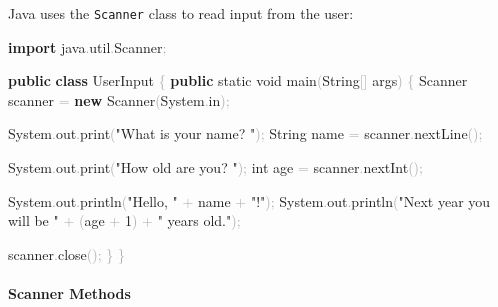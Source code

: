 \documentclass[
  justified,
  openright,
]{tufte-book}
\let\subsection\paragraph
\let\paragraph\paragraph
\newcommand{\KeywordTok}[1]{\textcolor{CodeKeyword}{\textbf{#1}}}  %
\newcommand{\StringTok}[1]{\textcolor{CodeString}{#1}}              %
\newcommand{\CodeNumTok}[1]{\textcolor{CodeNumber}{#1}}             %
\newcommand{\CodeFuncTok}[1]{\textcolor{CodeKeyword}{#1}}           %
\newcommand{\CodeTypeTok}[1]{\textcolor{CodeType}{#1}}              %
\newcommand{\CodeAccentTok}[1]{\textcolor{CodeAccent}{#1}}          %
\newcommand{\OperatorTok}[1]{\textcolor{DarkGray}{#1}}              %
\newenvironment{Shaded}{%
  \begin{mdframed}[style=TufteCode]%
}{%
  \end{mdframed}%
}
\let\subsection\paragraph
\let\paragraph\paragraph
\begin{document}
Java uses the \texttt{Scanner} class to read input from the user:

\begin{Shaded}
\begin{Highlighting}[]
\KeywordTok{import} \CodeAccentTok{java}\OperatorTok{.}\CodeAccentTok{util}\OperatorTok{.}\CodeAccentTok{Scanner}\OperatorTok{;}
 
\KeywordTok{public} \KeywordTok{class} UserInput \OperatorTok{\{}
    \KeywordTok{public} \CodeTypeTok{static} \CodeTypeTok{void} \CodeFuncTok{main}\OperatorTok{(}String\OperatorTok{[]} args\OperatorTok{)} \OperatorTok{\{}
        Scanner scanner \OperatorTok{=} \KeywordTok{new} Scanner\OperatorTok{(}System\OperatorTok{.}\CodeFuncTok{in}\OperatorTok{);}
 
        System\OperatorTok{.}\CodeFuncTok{out}\OperatorTok{.}\CodeFuncTok{print}\OperatorTok{(}\StringTok{"What is your name? "}\OperatorTok{);}
        String name \OperatorTok{=} scanner\OperatorTok{.}\CodeFuncTok{nextLine}\OperatorTok{();}
 
        System\OperatorTok{.}\CodeFuncTok{out}\OperatorTok{.}\CodeFuncTok{print}\OperatorTok{(}\StringTok{"How old are you? "}\OperatorTok{);}
        \CodeTypeTok{int} age \OperatorTok{=} scanner\OperatorTok{.}\CodeFuncTok{nextInt}\OperatorTok{();}
 
        System\OperatorTok{.}\CodeFuncTok{out}\OperatorTok{.}\CodeFuncTok{println}\OperatorTok{(}\StringTok{"Hello, "} \OperatorTok{+} name \OperatorTok{+} \StringTok{"!"}\OperatorTok{);}
        System\OperatorTok{.}\CodeFuncTok{out}\OperatorTok{.}\CodeFuncTok{println}\OperatorTok{(}\StringTok{"Next year you will be "} \OperatorTok{+} \OperatorTok{(}age \OperatorTok{+} \CodeNumTok{1}\OperatorTok{)} \OperatorTok{+} \StringTok{" years old."}\OperatorTok{);}
 
        scanner\OperatorTok{.}\CodeFuncTok{close}\OperatorTok{();}
    \OperatorTok{\}}
\OperatorTok{\}}
\end{Highlighting}
\end{Shaded}

\subsection{Scanner Methods}\label{scanner-methods}
\end{document}
